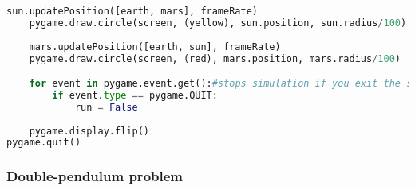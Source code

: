 \documentclass[12pt]{article}
\begin{document}
\begin{lstlisting}[language=Python]
    sun.updatePosition([earth, mars], frameRate)
    pygame.draw.circle(screen, (yellow), sun.position, sun.radius/100)
    
    mars.updatePosition([earth, sun], frameRate)
    pygame.draw.circle(screen, (red), mars.position, mars.radius/100)

    for event in pygame.event.get():#stops simulation if you exit the screen
        if event.type == pygame.QUIT:
            run = False
    
    pygame.display.flip()
pygame.quit()

\end{lstlisting}


\subsubsection{Double-pendulum problem}
\end{document}
